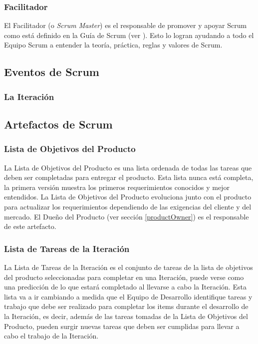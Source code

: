 \subsubsection{Facilitador} \label{scrumMaster}
El Facilitador (o \emph{Scrum Master}) es el responsable de promover y apoyar Scrum como está definido en la Guía de Scrum (ver \cite{scrumSchwaber}). Esto lo logran ayudando a todo el Equipo Scrum a entender la teoría, práctica, reglas y valores de Scrum. \cite{scrumSchwaber}

\subsection{Eventos de Scrum}
\subsubsection{La Iteración} \label{sprint}


\subsection{Artefactos de Scrum}
\subsubsection{Lista de Objetivos del Producto} \label{productBacklog}
La Lista de Objetivos del Producto es una lista ordenada de todas las tareas que deben ser completadas para entregar el producto. Esta lista nunca está completa, la primera versión muestra los primeros requerimientos conocidos y mejor entendidos. \cite{scrumSchwaber} La Lista de Objetivos del Producto evoluciona junto con el producto para actualizar los requerimientos dependiendo de las exigencias del cliente y del mercado. El Dueño del Producto (ver sección \ref{productOwner}) es el responsable de este artefacto.

\subsubsection{Lista de Tareas de la Iteración}
La Lista de Tareas de la Iteración es el conjunto de tareas de la lista de objetivos del producto seleccionadas para completar en una Iteración, puede verse como una predicción de lo que estará completado al llevarse a cabo la Iteración. \cite{scrumSchwaber} Esta lista va a ir cambiando a medida que el Equipo de Desarrollo identifique tareas y trabajo que debe ser realizado para completar los items durante el desarrollo de la Iteración, es decir, además de las tareas tomadas de la Lista de Objetivos del Producto, pueden surgir nuevas tareas que deben ser cumplidas para llevar a cabo el trabajo de la Iteración.

